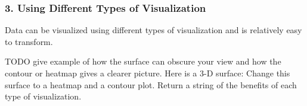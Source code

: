 \subsubsection*{3. Using Different Types of Visualization}

Data can be visualized using different types of visualization and is relatively easy to transform.

\begin{problem}
TODO give example of how the surface can obscure your view and how the contour or heatmap gives a clearer picture.
Here is a 3-D surface:
Change this surface to a heatmap and a contour plot.  Return a string of the benefits of each type of visualization.
\label{prob:differentVisualizations}
\end{problem}

